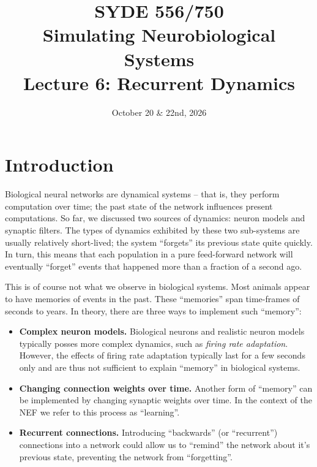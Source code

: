 \documentclass[10pt,letterpaper,oneside]{article}
\date{October 20 \& 22nd, 2026}
\title{SYDE 556/750 \\ Simulating Neurobiological Systems \\ Lecture 6: Recurrent Dynamics}
\begin{document}

\section{Introduction}


Biological neural networks are dynamical systems -- that is, they perform computation over time; the past state of the network influences present computations. So far, we discussed two sources of dynamics: neuron models and synaptic filters. The types of dynamics exhibited by these two sub-systems are usually relatively short-lived; the system \enquote{forgets} its previous state quite quickly. In turn, this means that each population in a pure feed-forward network will eventually \enquote{forget} events that happened more than a fraction of a second ago.


This is of course not what we observe in biological systems. Most animals appear to have memories of events in the past. These \enquote{memories} span time-frames of seconds to years. In theory, there are three ways to implement such \enquote{memory}:
\begin{itemize}
	\item \textbf{Complex neuron models.} Biological neurons and realistic neuron models typically posses more complex dynamics, such as \emph{firing rate adaptation}. However, the effects of firing rate adaptation typically last for a few seconds only and are thus not sufficient to explain \enquote{memory} in biological systems.
	\item \textbf{Changing connection weights over time.} Another form of \enquote{memory} can be implemented by changing synaptic weights over time. In the context of the NEF we refer to this process as \enquote{learning}.
	\item \textbf{Recurrent connections.} Introducing \enquote{backwards} (or \enquote{recurrent}) connections into a network could allow us to \enquote{remind} the network about it's previous state, preventing the network from \enquote{forgetting}.
\end{itemize}
\end{document}
